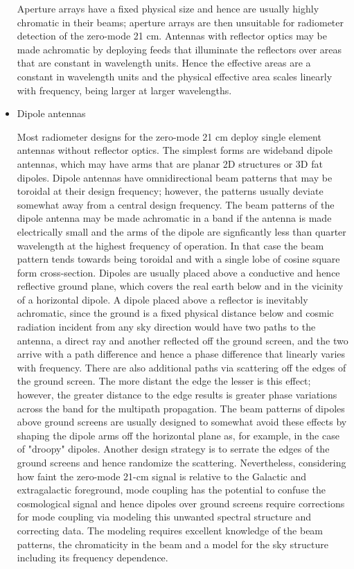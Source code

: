 \begin{itemize}
   Aperture arrays have a fixed physical size and hence are usually highly chromatic in their beams; aperture arrays are then unsuitable for radiometer detection of the zero-mode 21 cm.  Antennas with reflector optics may be made achromatic by deploying feeds that illuminate the reflectors over areas that are constant in wavelength units. Hence the effective areas are a constant in wavelength units and the physical effective area scales linearly with frequency, being larger at larger wavelengths.
   
   \item
   Dipole antennas
   
   Most radiometer designs for the zero-mode 21 cm deploy single element antennas without reflector optics.  The simplest forms are wideband dipole antennas, which may have arms that are planar 2D structures or 3D fat dipoles.  Dipole antennas have omnidirectional beam patterns that may be toroidal at their design frequency; however, the patterns usually deviate somewhat away from a central design frequency.  The beam patterns of the dipole antenna may be made achromatic in a band if the antenna is made electrically small and the arms of the dipole are signficantly less than quarter wavelength at the highest frequency of operation.  In that case the beam pattern tends towards being toroidal and with a single lobe of cosine square form cross-section.  Dipoles are usually placed above a conductive and hence reflective ground plane, which covers the real earth below and in the vicinity of a horizontal dipole.  A dipole placed above a reflector is inevitably achromatic, since the ground is a fixed physical distance below and cosmic radiation incident from any sky direction would have two paths to the antenna, a direct ray and another reflected off the ground screen, and the two arrive with a path difference and hence a phase difference that linearly varies with frequency.  There are also additional paths via scattering off the edges of the ground screen. The more distant the edge the lesser is this effect; however, the greater distance to the edge results is greater phase variations across the band for the multipath propagation.  The beam patterns of dipoles above ground screens are usually designed to somewhat avoid these effects by shaping the dipole arms off the horizontal plane as, for example, in the case of "droopy" dipoles.  Another design strategy is to serrate the edges of the ground screens and hence randomize the scattering. Nevertheless, considering how faint the zero-mode 21-cm signal is relative to the Galactic and extragalactic foreground, mode coupling has the potential to confuse the cosmological signal and hence dipoles over ground screens require corrections for mode coupling via modeling this unwanted spectral structure and correcting data.  The modeling requires excellent knowledge of the beam patterns, the chromaticity in the beam and a model for the sky structure including its frequency dependence.
   

\end{itemize}
